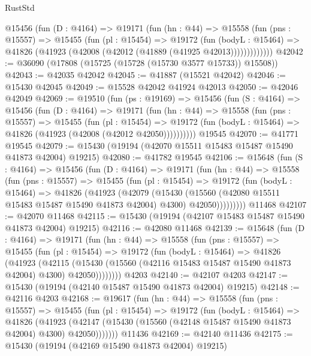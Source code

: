 \begin{lexlean}{RustStd}
\begin{coremodule}
{\begin{coremodule}
{{{{{{{{{{{{{{{{{{{{{{{{{{{{{{{{{{{{{{{{{{{{{{{{{{{{{{{{{{{{        @15456
          (fun (D : @4164) =>
          @19171
            (fun (hn : @44) =>
            @15558
              (fun (pns : @15557) =>
              @15455
                (fun (pl : @15454) =>
                @19172
                  (fun (bodyL : @15464) =>
                  @41826 (@41923 (@42008 (@42012 (@41889 (@41925 @42013)))))))))))))
@42042 := @36090 (@17808 (@15725 (@15728 (@15730 @3577 @15733)) @15508))
@42043 := @42035 @42042
@42045 := @41887 (@15521 @42042)
@42046 := @15430 @42045
@42049 := @15528 @42042 @41924 @42013
@42050 := @42046 @42049
@42069 := @19510
    (fun (ps : @19169) =>
    @15456
      (fun (S : @4164) =>
      @15456
        (fun (D : @4164) =>
        @19171
          (fun (hn : @44) =>
          @15558
            (fun (pns : @15557) =>
            @15455
              (fun (pl : @15454) =>
              @19172 (fun (bodyL : @15464) => @41826 (@41923 (@42008 (@42012 @42050))))))))))
    @19545
@42070 := @41771 @19545
@42079 := @15430 (@19194 (@42070 @15511 @15483 @15487 @15490 @41873 @42004) @19215)
@42080 := @41782 @19545
@42106 := @15648
    (fun (S : @4164) =>
    @15456
      (fun (D : @4164) =>
      @19171
        (fun (hn : @44) =>
        @15558
          (fun (pns : @15557) =>
          @15455
            (fun (pl : @15454) =>
            @19172
              (fun (bodyL : @15464) =>
              @41826
                (@41923
                  (@42079
                    (@15430
                      (@15560 (@42080 @15511 @15483 @15487 @15490 @41873 @42004) @4300)
                      @42050)))))))))
    @11468
@42107 := @42070 @11468
@42115 := @15430 (@19194 (@42107 @15483 @15487 @15490 @41873 @42004) @19215)
@42116 := @42080 @11468
@42139 := @15648
    (fun (D : @4164) =>
    @19171
      (fun (hn : @44) =>
      @15558
        (fun (pns : @15557) =>
        @15455
          (fun (pl : @15454) =>
          @19172
            (fun (bodyL : @15464) =>
            @41826
              (@41923
                (@42115
                  (@15430 (@15560 (@42116 @15483 @15487 @15490 @41873 @42004) @4300) @42050))))))))
    @4203
@42140 := @42107 @4203
@42147 := @15430 (@19194 (@42140 @15487 @15490 @41873 @42004) @19215)
@42148 := @42116 @4203
@42168 := @19617
    (fun (hn : @44) =>
    @15558
      (fun (pns : @15557) =>
      @15455
        (fun (pl : @15454) =>
        @19172
          (fun (bodyL : @15464) =>
          @41826
            (@41923
              (@42147 (@15430 (@15560 (@42148 @15487 @15490 @41873 @42004) @4300) @42050)))))))
    @11436
@42169 := @42140 @11436
@42175 := @15430 (@19194 (@42169 @15490 @41873 @42004) @19215)
}}}}}}}}}}}}}}}}}}}}}}}}}}}}}}}}}}}}}}}}}}}}}}}}}}}}}}}}}}}}
\end{coremodule}}
\end{coremodule}
\end{lexlean}
